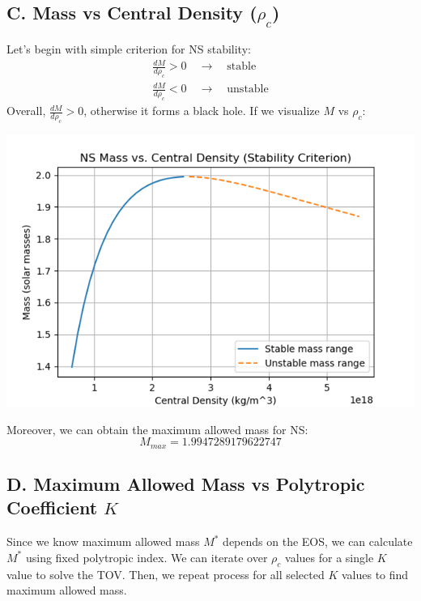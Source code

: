 \documentclass{article}
\begin{document}
\subsection*{C. Mass vs Central Density ($\rho_c$)}
Let's begin with simple criterion for NS stability:
\begin{gather}
    \frac{dM}{d\rho_c} > 0 \quad \longrightarrow \quad \text{stable} \\
    \frac{dM}{d\rho_c} < 0 \quad \longrightarrow \quad \text{unstable}    
\end{gather}
Overall, $\frac{dM}{d\rho_c} >0$, otherwise it forms a black hole. If we visualize $M$ vs $\rho_c$:
\begin{center}
    \includegraphics[scale=0.65]{images_einstein/e3_M_vs_rhoc.png}
\end{center}
Moreover, we can obtain the maximum allowed mass for NS:
\begin{equation}
    M_{max} = 1.9947289179622747
\end{equation}

\subsection*{D. Maximum Allowed Mass vs Polytropic Coefficient $K$}
Since we know maximum allowed mass $M^{*}$ depends on the EOS, we can calculate $M^{*}$ using fixed polytropic index. We can iterate over $\rho_c$ values for a single $K$ value to solve the TOV. Then, we repeat process for all selected $K$ values to find maximum allowed mass.
\end{document}
